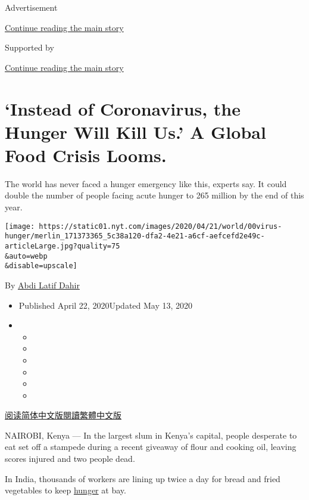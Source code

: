 Advertisement

\protect\hyperlink{after-top}{Continue reading the main story}

Supported by

\protect\hyperlink{after-sponsor}{Continue reading the main story}

\hypertarget{instead-of-coronavirus-the-hunger-will-kill-us-a-global-food-crisis-looms}{%
\section{`Instead of Coronavirus, the Hunger Will Kill Us.' A Global
Food Crisis
Looms.}\label{instead-of-coronavirus-the-hunger-will-kill-us-a-global-food-crisis-looms}}

The world has never faced a hunger emergency like this, experts say. It
could double the number of people facing acute hunger to 265 million by
the end of this year.

\texttt{[image: https://static01.nyt.com/images/2020/04/21/world/00virus-hunger/merlin\_171373365\_5c38a120-dfa2-4e21-a6cf-aefcefd2e49c-articleLarge.jpg?quality=75\\\&auto=webp\\\&disable=upscale]}

By \href{https://www.nytimes.com/by/abdi-latif-dahir}{Abdi Latif Dahir}

\begin{itemize}
\item
  Published April 22, 2020Updated May 13, 2020
\item
  \begin{itemize}
  \item
  \item
  \item
  \item
  \item
  \item
  \end{itemize}
\end{itemize}

\href{https://cn.nytimes.com/world/20200423/coronavirus-hunger-crisis/}{阅读简体中文版}\href{https://cn.nytimes.com/world/20200423/coronavirus-hunger-crisis/zh-hant/}{閱讀繁體中文版}

NAIROBI, Kenya --- In the largest slum in Kenya's capital, people
desperate to eat set off a stampede during a recent giveaway of flour
and cooking oil, leaving scores injured and two people dead.

In India, thousands of workers are lining up twice a day for bread and
fried vegetables to keep
\href{https://www.nytimes.com/2020/05/06/us/politics/coronavirus-hunger-food-stamps.html}{hunger}
at bay.

